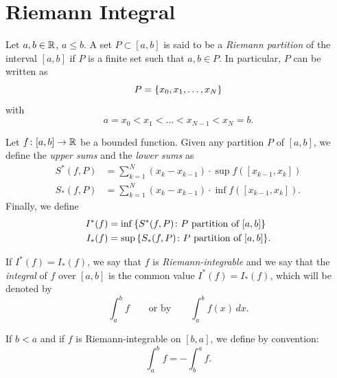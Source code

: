 \section{Riemann Integral}

\begin{definition}%
\label{def:integrale}%
\mymark{***}%
%
%
%
Let $a,b\in {\mathbb R}$, $a \le b$.
A set $P\subset [a,b]$ is said to be a \emph{Riemann partition}%
%
of the interval $[a,b]$ if $P$ is a finite set such that $a,b\in P$.
In particular, $P$ can be written as
\[
 P = {\left\{  x_0, x_1, \dots, x_N \right\}}
\]
with
\[
  a = x_0 < x_1 < \dots < x_{N-1} < x_N = b.
\]

Let $f\colon [a,b] \to {\mathbb R}$ be a bounded function.
Given any partition $P$ of $[a,b]$, we define
the \emph{upper sums} and the \emph{lower sums}%
%
as
\begin{align*}
S^*(f,P)
&= \sum_{k=1}^N (x_k - x_{k-1}) \cdot \sup f([x_{k-1},x_k]) \\
S_*(f,P)
&= \sum_{k=1}^N (x_k - x_{k-1}) \cdot \inf f([x_{k-1},x_k]).
\end{align*}
Finally, we define
\begin{align*}
  I^*(f) &= \inf {\left\{ S^*(f,P) \colon \text{$P$ partition of $[a,b]$} \right\}}
  \\
  I_*(f) &= \sup {\left\{ S_*(f,P) \colon \text{$P$ partition of $[a,b]$} \right\}}.
\end{align*}

If $I^*(f) = I_*(f)$, we say that $f$ is
\emph{Riemann-integrable}%
%
%
%
%
%
%
and we say that the \emph{integral} of $f$ over $[a,b]$ is
the common value $I^*(f)=I_*(f)$, which will be denoted by
\[
  \int_a^b f
  \qquad{\text{or by}} \qquad
  \int_a^b f(x)\, dx.
\]

If $b<a$ and if $f$ is Riemann-integrable on $[b,a]$,
we define by convention:
\[
  \int_a^b f = -\int_b^a f.
\]
\end{definition}

